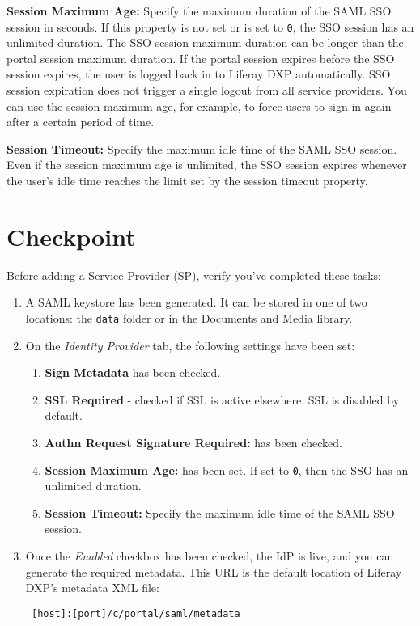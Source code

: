 \textbf{Session Maximum Age:} Specify the maximum duration of the SAML
SSO session in seconds. If this property is not set or is set to
\texttt{0}, the SSO session has an unlimited duration. The SSO session
maximum duration can be longer than the portal session maximum duration.
If the portal session expires before the SSO session expires, the user
is logged back in to Liferay DXP automatically. SSO session expiration
does not trigger a single logout from all service providers. You can use
the session maximum age, for example, to force users to sign in again
after a certain period of time.

\textbf{Session Timeout:} Specify the maximum idle time of the SAML SSO
session. Even if the session maximum age is unlimited, the SSO session
expires whenever the user's idle time reaches the limit set by the
session timeout property.

\section{Checkpoint}\label{checkpoint-2}

Before adding a Service Provider (SP), verify you've completed these
tasks:

\begin{enumerate}
\def\labelenumi{\arabic{enumi}.}
\item
  A SAML keystore has been generated. It can be stored in one of two
  locations: the \texttt{data} folder or in the Documents and Media
  library.
\item
  On the \emph{Identity Provider} tab, the following settings have been
  set:

  \begin{enumerate}
  \def\labelenumii{\alph{enumii}.}
  \item
    \textbf{Sign Metadata} has been checked.
  \item
    \textbf{SSL Required} - checked if SSL is active elsewhere. SSL is
    disabled by default.
  \item
    \textbf{Authn Request Signature Required:} has been checked.
  \item
    \textbf{Session Maximum Age:} has been set. If set to \texttt{0},
    then the SSO has an unlimited duration.
  \item
    \textbf{Session Timeout:} Specify the maximum idle time of the SAML
    SSO session.
  \end{enumerate}
\item
  Once the \emph{Enabled} checkbox has been checked, the IdP is live,
  and you can generate the required metadata. This URL is the default
  location of Liferay DXP's metadata XML file:

\begin{verbatim}
 [host]:[port]/c/portal/saml/metadata 
\end{verbatim}
\end{enumerate}

